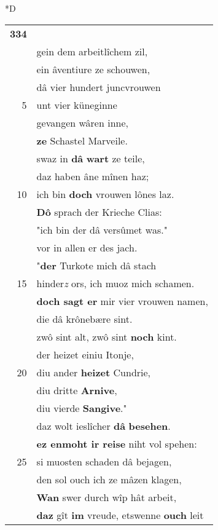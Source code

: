 \documentclass[8pt,a4paper,notitlepage]{article}
\begin{document}
\begin{table}[ht]
\begin{minipage}[t]{0.5\linewidth}
\small
\begin{center}*D
\end{center}
\begin{tabular}{rl}
\textbf{334} & \textbf{\begin{large}D\end{large}ô} \textbf{vuor} der messenîe vil\\ 
 & gein dem arbeitlîchem zil,\\ 
 & ein âventiure ze schouwen,\\ 
 & dâ vier hundert juncvrouwen\\ 
5 & unt vier küneginne\\ 
 & gevangen wâren inne,\\ 
 & \textbf{ze} Schastel Marveile.\\ 
 & swaz in \textbf{dâ} \textbf{wart} ze teile,\\ 
 & daz haben âne mînen haz;\\ 
10 & ich bin \textbf{doch} vrouwen lônes laz.\\ 
 & \textbf{Dô} sprach der Krieche Clias:\\ 
 & "ich bin der dâ versûmet was."\\ 
 & vor in allen er des jach.\\ 
 & "\textbf{der} Turkote mich dâ stach\\ 
15 & hinder\textit{z} ors, ich muoz mich schamen.\\ 
 & \textbf{doch sagt er} mir vier vrouwen namen,\\ 
 & die dâ krônebære sint.\\ 
 & zwô sint alt, zwô sint \textbf{noch} kint.\\ 
 & der heizet einiu Itonje,\\ 
20 & diu ander \textbf{heizet} Cundrie,\\ 
 & diu dritte \textbf{Arnive},\\ 
 & diu vierde \textbf{Sangive}."\\ 
 & daz wolt ieslîcher \textbf{dâ} \textbf{besehen}.\\ 
 & \textbf{ez enmoht ir reise} niht vol spehen:\\ 
25 & si muosten schaden dâ bejagen,\\ 
 & den sol ouch ich ze mâzen klagen,\\ 
 & \textbf{Wan} swer durch wîp hât arbeit,\\ 
 & \textbf{daz} gît \textbf{im} vreude, etswenne \textbf{ouch} leit\\ 

\end{tabular}
\end{minipage}
\end{table}
\end{document}
